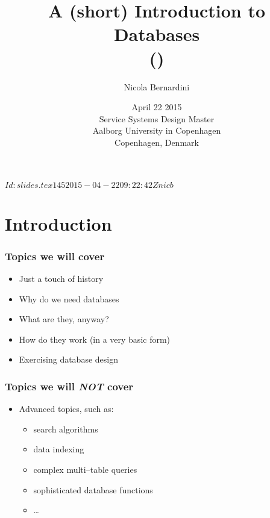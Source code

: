 \documentclass[\printmode,compress,xcolor=dvipsnames]{beamer}
\title[Databases]
{%
  A (short) Introduction to Databases\\
  {\tiny (\rcstag)}
}
\author{%
  Nicola Bernardini\\
    \href{mailto:\cpholderemail}{\cpholderemail}
}
\institute[SMERM]%
{%
  \href{http://www.conservatoriosantacecilia.it}
  {``S.Cecilia'' Conservatory - Rome}
}
\date[Copenhagen, 22/04/2015]{\scriptsize April 22 2015\\Service Systems Design Master\\Aalborg University in Copenhagen\\Copenhagen, Denmark}
\begin{document}
\svnInfo $Id: slides.tex 145 2015-04-22 09:22:42Z nicb $
  
\begin{frame}
  \titlepage
\end{frame}

\section{Introduction}

\newlength{\leftcolumn}
\setlength{\leftcolumn}{0.45\textwidth}
\newlength{\rightcolumn}
\setlength{\rightcolumn}{0.55\textwidth}

\begin{frame}
  \frametitle<+->{Topics we will cover}

  \begin{itemize}[<+- | alert@+->]

      \item Just a touch of history

			\item Why do we need databases

			\item What are they, anyway?

			\item How do they work (in a very basic form)

			\item Exercising database design

  \end{itemize}

\end{frame}

\begin{frame}
				\frametitle<+->{Topics we will \emph{NOT} cover}


  \begin{itemize}[<+- | alert@+->]

      \item Advanced topics, such as:

  				\begin{itemize}[<+- | alert@+->]

						\item search algorithms

						\item data indexing

						\item complex multi--table queries

						\item sophisticated database functions

						\item \dots

          \end{itemize}

  \end{itemize}

\end{frame}
\end{document}
